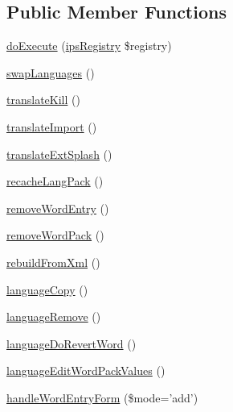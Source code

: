 \subsection*{Public Member Functions}
\begin{DoxyCompactItemize}
\item 
\hyperlink{classadmin__core__languages__manage__languages_afbc4e912a0604b94d47d66744c64d8ba}{do\-Execute} (\hyperlink{classips_registry}{ips\-Registry} \$registry)
\item 
\hyperlink{classadmin__core__languages__manage__languages_afc03c104ee3dadf7430a1e335aefcf5d}{swap\-Languages} ()
\item 
\hyperlink{classadmin__core__languages__manage__languages_af76035bdf782ea8aa2e970397f57c91b}{translate\-Kill} ()
\item 
\hyperlink{classadmin__core__languages__manage__languages_a9b94a0954bdbb79643e58329aba3413f}{translate\-Import} ()
\item 
\hyperlink{classadmin__core__languages__manage__languages_a26cad3c71bca254b14ed20ed4f36256d}{translate\-Ext\-Splash} ()
\item 
\hyperlink{classadmin__core__languages__manage__languages_a53dc741fc830a98b02280738db7f5aad}{recache\-Lang\-Pack} ()
\item 
\hyperlink{classadmin__core__languages__manage__languages_a455e58b9f042577788143eb6a0392efc}{remove\-Word\-Entry} ()
\item 
\hyperlink{classadmin__core__languages__manage__languages_ac35a14e259e4fe3ced47a687990cec0b}{remove\-Word\-Pack} ()
\item 
\hyperlink{classadmin__core__languages__manage__languages_a059a1213775bcb2bee2f3cae0835da90}{rebuild\-From\-Xml} ()
\item 
\hyperlink{classadmin__core__languages__manage__languages_a316cec2b460e4469d542fd582c23e4f3}{language\-Copy} ()
\item 
\hyperlink{classadmin__core__languages__manage__languages_a35196714970b5674c07347c4255c363e}{language\-Remove} ()
\item 
\hyperlink{classadmin__core__languages__manage__languages_a6bdf4428474338ca15c178a168859772}{language\-Do\-Revert\-Word} ()
\item 
\hyperlink{classadmin__core__languages__manage__languages_a6876e49bf5f6ca49fc6eacfac34a28fc}{language\-Edit\-Word\-Pack\-Values} ()
\item 
\hyperlink{classadmin__core__languages__manage__languages_a5d735a12ce2cde1be7e412d7099dbd19}{handle\-Word\-Entry\-Form} (\$mode='add')

\end{DoxyCompactItemize}
